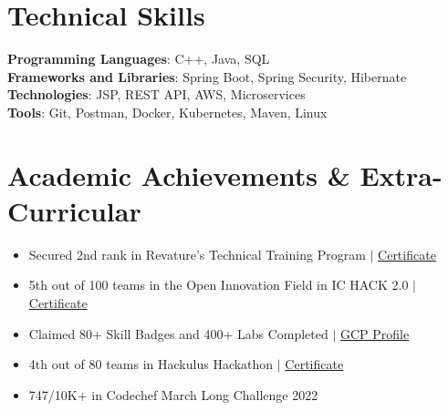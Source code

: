 \documentclass[letterpaper,11pt]{article}
\newcommand{\resumeItem}[1]{
  \item\small{
    {#1 \vspace{-2pt}}
  }
}
\newcommand{\resumeItemListStart}{\begin{itemize}}
\newcommand{\resumeItemListEnd}{\end{itemize}\vspace{-5pt}}
\begin{document}
\section{Technical Skills}
 \begin{itemize}[leftmargin=0.15in, label={}]
    \small{\item{
     \textbf{Programming Languages}{: C++, Java, SQL} \\
     \textbf{Frameworks and Libraries}{: Spring Boot, Spring Security, Hibernate} \\
     \textbf{Technologies}{: JSP, REST API, AWS, Microservices} \\
     \textbf{Tools}{: Git, Postman, Docker, Kubernetes, Maven, Linux}
    }}
 \end{itemize}




\section{Academic Achievements \& Extra-Curricular}

    \begin{itemize}[leftmargin=0.15in, label={}]
    \small{\item{
    \resumeItemListStart
  \resumeItem{Secured 2nd rank in Revature’s Technical Training Program $|$
  \href{https://drive.google.com/file/d/1yFAyLg2O3_SyAr7CW-wLTshWMvlGpsk8/view?usp=sharing}{Certificate}}
  \resumeItem{5th out of 100 teams in the Open Innovation Field in IC HACK 2.0 $|$ \href{https://drive.google.com/file/d/1SeL0qU6O4hFTnG8Ef7F7ifKkHy5lRoSG/view?usp=sharing}{Certificate}}
   \resumeItem{Claimed 80+ Skill Badges and 400+ Labs Completed $|$ \href{https://www.cloudskillsboost.google/public_profiles/27c0ba2b-577b-4d32-a506-64591e89e383}{GCP Profile}}
  \resumeItem{4th out of 80 teams in Hackulus Hackathon $|$ \href{https://drive.google.com/file/d/18ciyyMktMdTX3gtiTdu328mGsj4R-QYG/view?usp=sharing}{Certificate}}
  \resumeItem{747/10K+ in Codechef March Long Challenge 2022}
  \
  
    \resumeItemListEnd
    }}
    \end{itemize}




\end{document}
